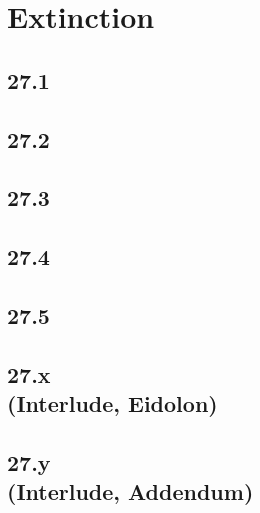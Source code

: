 \part{Extinction}
 \chapter{27.1}
 \chapter{27.2}
 \chapter{27.3}
 \chapter{27.4}
 \chapter{27.5}
 \chapter[27.x (Interlude, Eidolon)]{27.x\\(Interlude, Eidolon)}
 \chapter[27.y (Interlude, Addendum)]{27.y\\(Interlude, Addendum)}








